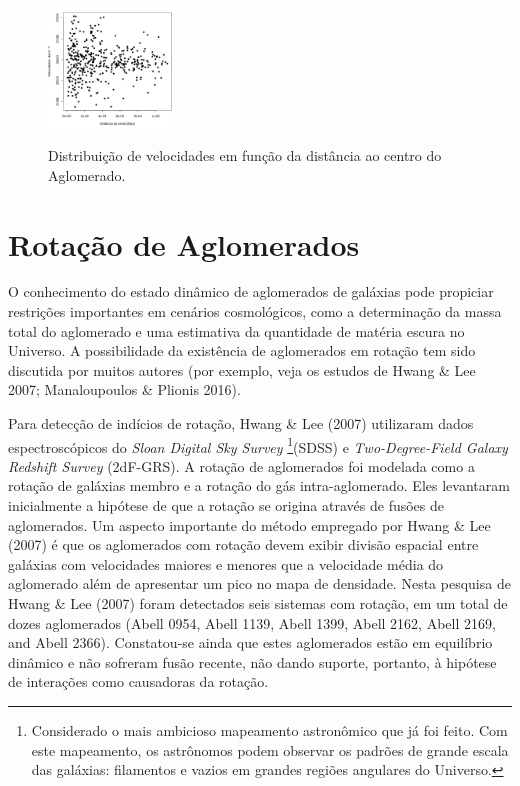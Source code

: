 \begin{figure}[!htb]
	\centering
	\caption{Distribuição de velocidades em função da distância ao centro do Aglomerado.}
	\includegraphics[width=0.3\textwidth]{04-figuras/distCenter}
	\label{fig2}
\end{figure}

\chapter{Rotação de Aglomerados}

O conhecimento do estado dinâmico de aglomerados de galáxias pode propiciar restrições importantes em cenários cosmológicos, como a determinação da massa total do aglomerado e uma estimativa da quantidade de matéria escura no Universo. A possibilidade da existência de aglomerados em rotação tem sido discutida por muitos autores (por exemplo, veja os estudos de Hwang \& Lee 2007; Manaloupoulos \& Plionis 2016). 

Para detecção de indícios de rotação, Hwang \& Lee (2007) utilizaram dados espectroscópicos do \textit{Sloan Digital Sky Survey} \footnote{Considerado o mais ambicioso mapeamento astronômico que já foi feito. Com este mapeamento, os astrônomos podem observar os padrões de grande escala das galáxias: filamentos e vazios em grandes regiões angulares do Universo.}(SDSS) e \textit{Two-Degree-Field Galaxy Redshift Survey} (2dF-GRS). A rotação de aglomerados foi modelada como a rotação de galáxias membro e a rotação do gás intra-aglomerado. Eles levantaram inicialmente a hipótese de que a rotação se origina através de fusões de aglomerados. Um aspecto importante do método empregado por Hwang \& Lee (2007) é que os aglomerados com rotação devem exibir divisão espacial entre galáxias com velocidades maiores e menores que a velocidade média do aglomerado além de apresentar um pico no mapa de densidade. Nesta pesquisa de Hwang \& Lee (2007) foram detectados seis sistemas com rotação, em um total de dozes aglomerados (Abell 0954, Abell 1139, Abell 1399, Abell 2162, Abell 2169, and Abell 2366). Constatou-se ainda que estes aglomerados estão em equilíbrio dinâmico e não sofreram fusão recente, não dando suporte, portanto, à hipótese de interações como causadoras da rotação. 

